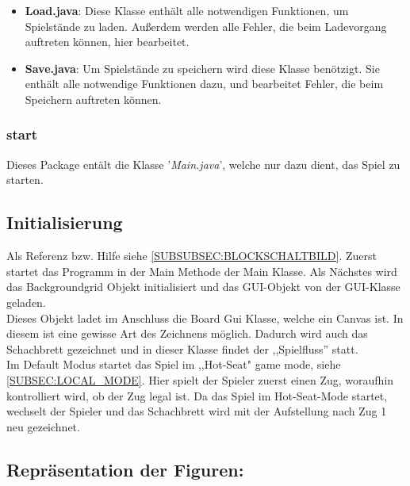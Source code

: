 \documentclass[12pt,a4paper]{article}
\newcommand{\cmnt}[1]{}			%
\begin{document}
{\begin{itemize}

	\item{\textbf{Load.java}: Diese Klasse enthält alle notwendigen Funktionen, um Spielstände zu laden. Außerdem werden alle Fehler, die beim Ladevorgang auftreten können, hier bearbeitet.  }
	
	\item{\textbf{Save.java}: Um Spielstände zu speichern wird diese Klasse benötzigt. Sie enthält alle notwendige Funktionen dazu, und bearbeitet Fehler, die beim Speichern auftreten können. }


\end{itemize}

\subsubsection{start}

Dieses Package entält die Klasse '\textit{Main.java}', welche nur dazu dient, das Spiel zu starten.

\newpage
\subsection{Initialisierung}
\label{SUBSEC:INIT}

\cmnt{Hier soll erklärt werden wie JavaChess initialisiert wird.}

Als Referenz bzw. Hilfe siehe \ref{SUBSUBSEC:BLOCKSCHALTBILD}.
Zuerst startet das Programm in der Main Methode der Main Klasse. Als Nächstes wird das Backgroundgrid Objekt initialisiert und das GUI-Objekt von der GUI-Klasse geladen. \\
Dieses Objekt ladet im Anschluss die Board Gui Klasse, welche ein Canvas ist. In diesem ist eine gewisse Art des Zeichnens möglich. Dadurch wird auch das Schachbrett gezeichnet und in dieser Klasse findet der ,,Spielfluss'' statt. \\ 
Im Default Modus startet das Spiel im ,,Hot-Seat" game mode, siehe \ref{SUBSEC:LOCAL_MODE}. Hier spielt der Spieler zuerst einen Zug, woraufhin kontrolliert wird, ob der Zug legal ist. Da das Spiel im Hot-Seat-Mode startet, wechselt der Spieler und das Schachbrett wird mit der Aufstellung nach Zug 1 neu gezeichnet.

\subsection{Repräsentation der Figuren:}

}
\end{document}
